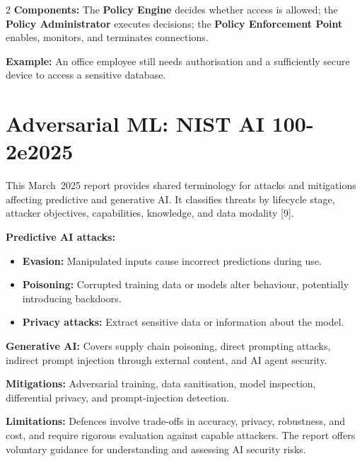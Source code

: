 \documentclass[11pt,a4paper]{article}
\begin{document}
\begin{multicols}{2}
\textbf{Components:} The \textbf{Policy Engine} decides
whether access is allowed; the \textbf{Policy Administrator}
executes decisions; the \textbf{Policy Enforcement Point}
enables, monitors, and terminates connections.

\textbf{Example:} An office employee still needs authorisation
and a sufficiently secure device to access a sensitive database.

\section{Adversarial ML: NIST AI 100-2e2025}

This March~2025 report provides shared terminology for
attacks and mitigations affecting predictive and generative
AI. It classifies threats by lifecycle stage, attacker
objectives, capabilities, knowledge, and data modality [9].

\textbf{Predictive AI attacks:}
\begin{itemize}
\item \textbf{Evasion:} Manipulated inputs cause incorrect
predictions during use.
\item \textbf{Poisoning:} Corrupted training data or models
alter behaviour, potentially introducing backdoors.
\item \textbf{Privacy attacks:} Extract sensitive data or
information about the model.
\end{itemize}

\textbf{Generative AI:} Covers supply chain poisoning,
direct prompting attacks, indirect prompt injection through
external content, and AI agent security.

\textbf{Mitigations:} Adversarial training, data sanitisation,
model inspection, differential privacy, and prompt-injection
detection.

\textbf{Limitations:} Defences involve trade-offs in accuracy,
privacy, robustness, and cost, and require rigorous evaluation
against capable attackers. The report offers voluntary
guidance for understanding and assessing AI security risks.

\end{multicols}
\end{document}
